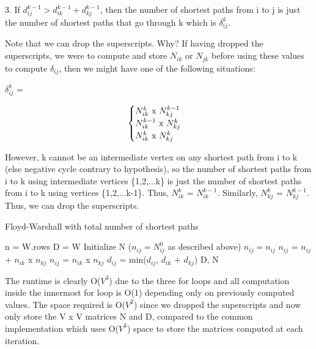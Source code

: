 \documentclass[11pt,a4paper]{article}
\begin{document}
3. If $d_{ij}^{k-1} > d_{ik}^{k-1} + d_{kj}^{k-1}$, then the number of shortest paths from i to j is just the number of shortest paths that go through k which is $\delta_{ij}^{k}$.

Note that we can drop the superscripts. Why? If having dropped the superscripts, we were to compute and store $N_{ik}$ or $N_{jk}$ before using these values to compute $\delta_{ij}$, then we might have one of the following situations:

$\delta_{ij}^{k}$ = 

\[ \begin{cases} 
      N_{ik}^{k}$ x $N_{kj}^{k-1} &  \\
      N_{ik}^{k-1}$ x $N_{kj}^{k} &  \\
      N_{ik}^{k}$ x $N_{kj}^{k} & 
   \end{cases}
\]

However, k cannot be an intermediate vertex on any shortest path from i to k (else negative cycle contrary to hypothesis), so the number of shortest paths from i to k using intermediate vertices \{1,2,...k\} is just the number of shortest paths from i to k using vertices \{1,2,...k-1\}. Thus, $N_{ik}^{k}$ = $N_{ik}^{k-1}$. Similarly, $N_{kj}^{k}$ = $N_{kj}^{k-1}$. Thus, we can drop the superscripts.


\begin{algorithm}
\caption{Floyd-Warshall with total number of shortest paths}
\begin{algorithmic}[1]
 \State n = W.rows
 \State D = W
 \State Initialize N ($n_{ij} = N_{ij}^{0}$ as described above)
 				\State $n_{ij} = n_{ij}$
 				\State $n_{ij}$ = $n_{ij}$ + $n_{ik}$ x $n_{kj}$
 			\Else
 				\State $n_{ij}$ = $n_{ik}$ x $n_{kj}$
 			\EndIf
 			\State $d_{ij}$ = min($d_{ij}$, $d_{ik}$ + $d_{kj}$)
 		\EndFor
 	\EndFor
 \EndFor
 \State \Return D, N
\EndFunction
\end{algorithmic}
\end{algorithm}

The runtime is clearly O($V^{3}$) due to the three for loops and all computation inside the innermost for loop is O(1) depending only on previously computed values. The space required is O($V^2$) since we dropped the superscripts and now only store the V x V matrices N and D, compared to the common implementation which uses O($V^3$) space to store the matrices computed at each iteration.
\end{document}
